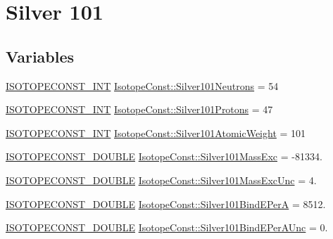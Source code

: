\hypertarget{group___isotope_const-_silver-_ag101}{}\section{Silver 101}
\label{group___isotope_const-_silver-_ag101}
\subsection*{Variables}
\begin{DoxyCompactItemize}
\item 
\mbox{\hyperlink{group___isotope_const-_macros_ga5f18360b3e99483a35c32d789e62621c}{I\+S\+O\+T\+O\+P\+E\+C\+O\+N\+S\+T\+\_\+\+I\+NT}} \mbox{\hyperlink{group___isotope_const-_silver-_ag101_ga375d1e9b53cf037fb7e006544c6799cd}{Isotope\+Const\+::\+Silver101\+Neutrons}} = 54
\item 
\mbox{\hyperlink{group___isotope_const-_macros_ga5f18360b3e99483a35c32d789e62621c}{I\+S\+O\+T\+O\+P\+E\+C\+O\+N\+S\+T\+\_\+\+I\+NT}} \mbox{\hyperlink{group___isotope_const-_silver-_ag101_gac79582b9b26781a784c9d03710356fb9}{Isotope\+Const\+::\+Silver101\+Protons}} = 47
\item 
\mbox{\hyperlink{group___isotope_const-_macros_ga5f18360b3e99483a35c32d789e62621c}{I\+S\+O\+T\+O\+P\+E\+C\+O\+N\+S\+T\+\_\+\+I\+NT}} \mbox{\hyperlink{group___isotope_const-_silver-_ag101_ga50153b868b13672c2494b84c5771b939}{Isotope\+Const\+::\+Silver101\+Atomic\+Weight}} = 101
\item 
\mbox{\hyperlink{group___isotope_const-_macros_ga8f45a7272ce02c0b4c65c44636ed719a}{I\+S\+O\+T\+O\+P\+E\+C\+O\+N\+S\+T\+\_\+\+D\+O\+U\+B\+LE}} \mbox{\hyperlink{group___isotope_const-_silver-_ag101_gaefffa2f550b6977866a126229ba25a55}{Isotope\+Const\+::\+Silver101\+Mass\+Exc}} = -\/81334.
\item 
\mbox{\hyperlink{group___isotope_const-_macros_ga8f45a7272ce02c0b4c65c44636ed719a}{I\+S\+O\+T\+O\+P\+E\+C\+O\+N\+S\+T\+\_\+\+D\+O\+U\+B\+LE}} \mbox{\hyperlink{group___isotope_const-_silver-_ag101_gaca8d102c474f0f26403055c42e785739}{Isotope\+Const\+::\+Silver101\+Mass\+Exc\+Unc}} = 4.
\item 
\mbox{\hyperlink{group___isotope_const-_macros_ga8f45a7272ce02c0b4c65c44636ed719a}{I\+S\+O\+T\+O\+P\+E\+C\+O\+N\+S\+T\+\_\+\+D\+O\+U\+B\+LE}} \mbox{\hyperlink{group___isotope_const-_silver-_ag101_gadd96adcbfcc113ee4738959310aa1117}{Isotope\+Const\+::\+Silver101\+Bind\+E\+PerA}} = 8512.
\item 
\mbox{\hyperlink{group___isotope_const-_macros_ga8f45a7272ce02c0b4c65c44636ed719a}{I\+S\+O\+T\+O\+P\+E\+C\+O\+N\+S\+T\+\_\+\+D\+O\+U\+B\+LE}} \mbox{\hyperlink{group___isotope_const-_silver-_ag101_ga72bb898adcf74aa5e59d75677e4b18c3}{Isotope\+Const\+::\+Silver101\+Bind\+E\+Per\+A\+Unc}} = 0.

\end{DoxyCompactItemize}
